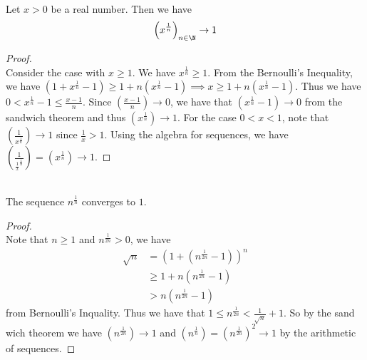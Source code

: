 \documentclass[a4paper]{article}
\begin{document}
\begin{eg}{}{}\\
Let $x>0$ be a real number. Then we have $$\left(x^{\frac{1}{n}}\right)_{n\in\N}\to 1$$ 
\begin{proof}\\ Consider the case with $x\geq1$. We have $x^\frac{1}{n}\geq1$. From the Bernoulli's Inequality, we have $\left(1+x^\frac{1}{n}-1\right)\geq1+n\left(x^\frac{1}{n}-1\right)\implies x\geq1+n\left(x^\frac{1}{n}-1\right)$.  Thus we have $0<x^\frac{1}{n}-1\leq\frac{x-1}{n}$. Since $\left(\frac{x-1}{n}\right)\to0$, we have that $\left(x^\frac{1}{n}-1\right)\to0$ from the sandwich theorem and thus $\left(x^\frac{1}{n}\right)\to1$. For the case $0<x<1$, note that $\left(\frac{1}{x^\frac{1}{n}}\right)\to1$ since $\frac{1}{x}>1$. Using the algebra for sequences, we have $\left(\frac{1}{\frac{1}{x}^{\frac{1}{n}}}\right)=\left(x^\frac{1}{n}\right)\to1$. 
\end{proof}
\end{eg}

\begin{eg}{}{}\\
The sequence $n^{\frac{1}{n}}$ converges to $1$. 
\begin{proof}\\ Note that $n\geq1$ and $n^\frac{1}{2n}>0$, we have 
\begin{align*}
\sqrt{n}&=(1+(n^\frac{1}{2n}-1))^n \\
&\geq1+n(n^\frac{1}{2n}-1) \\
&>n(n^\frac{1}{2n}-1)
\end{align*}
from Bernoulli's Inquality. Thus we have that $1\leq n^\frac{1}{2n}<\frac{1}{\sqrt{n}}+1$. So by the sand wich theorem we have $(n^\frac{1}{2n})\to1$ and $(n^\frac{1}{n})=(n^\frac{1}{2n})^2\to1$ by the arithmetic of sequences. 
\end{proof}
\end{eg}
\end{document}
